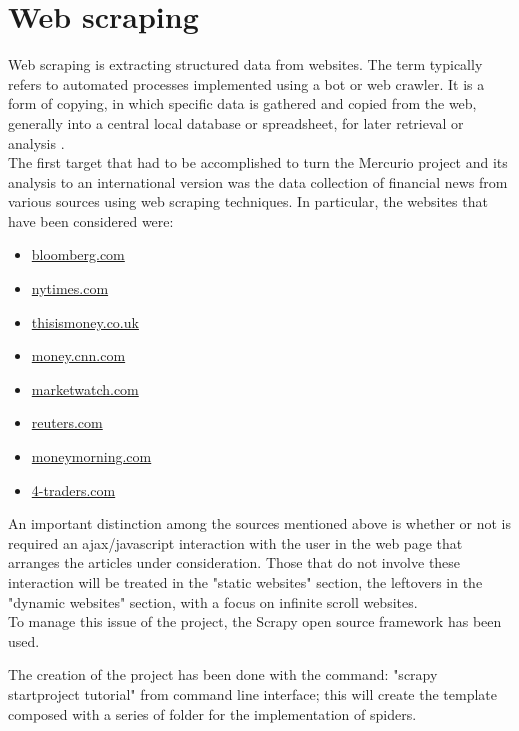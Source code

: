 \section{Web scraping}
Web scraping is extracting structured data from websites. The term typically refers to automated processes implemented using a bot or web crawler. It is a form of copying, in which specific data is gathered and copied from the web, generally into a central local database or spreadsheet, for later retrieval or analysis \cite{webscrapingwiki}. \\
The first target that had to be accomplished to turn the Mercurio project and its analysis to an international version was the data collection of financial news from various sources using web scraping techniques. In particular, the websites that have been considered were: 
\begin{itemize}
\item \href{https://www.bloomberg.com}{bloomberg.com}
\item \href{https://www.nytimes.com}{nytimes.com}
\item \href{https://www.thisismoney.co.uk}{thisismoney.co.uk}
\item \href{http://money.cnn.com}{money.cnn.com}
\item \href{http://www.marketwatch.com}{marketwatch.com}
\item \href{http://www.reuters.com}{reuters.com}
\item \href{http://www.moneymorning.com}{moneymorning.com} 
\item \href{http://www.4-traders.com/}{4-traders.com}
\end{itemize}
An important distinction among the sources mentioned above is whether or not is required an ajax/javascript interaction with the user in the web page that arranges the articles under consideration. Those that do not involve these interaction will be treated in the "static websites" section, the leftovers in the "dynamic websites" section, with a focus on infinite scroll websites. \\ 
To manage this issue of the project, the Scrapy open source framework \cite{scrapyframework} has been used. 
\par
The creation of the project has been done with the command: "scrapy startproject tutorial" from command line interface; this will create the template composed with a series of folder for the implementation of spiders.
